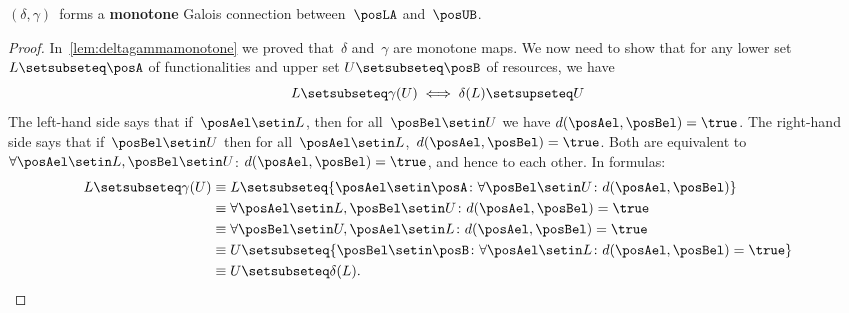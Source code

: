 \begin{lemma}
    $(\delta, \gamma)$~forms a \textbf{monotone}
    Galois connection between~$\posLA$ and~$\posUB$.
\end{lemma}
\begin{proof}
    In~\cref{lem:deltagammamonotone} we proved that~$\delta$ and~$\gamma$ are monotone maps.
    We now need to show that for any lower set~$L\setsubseteq \posA$ of functionalities and upper set $U\setsubseteq \posB$ of resources, we have
    \begin{equation}
        L\setsubseteq\gamma(U) \iff \delta(L)\setsupseteq U
    \end{equation}
    The left-hand side says that if~$\posAel\setin L$, then for all~$\posBel \setin U$ we have $d(\posAel,\posBel)=\true$.
    The right-hand side says that if~$\posBel\setin U$ then for all~$\posAel \setin L$,~$d(\posAel,\posBel)=\true$.
    Both are equivalent to~$\forall \posAel\setin L,\posBel\setin U$: $d(\posAel,\posBel)=\true$, and hence to each other.
    In formulas:
    \begin{equation}
        \begin{aligned}
            L \setsubseteq \gamma(U) & \equiv L\setsubseteq \{\posAel \setin \posA\colon \forall \posBel\setin U\colon d(\posAel,\posBel)\} \\
                                  & \equiv \forall \posAel\setin L, \posBel\setin U \colon d(\posAel,\posBel)=\true \\
                                  & \equiv \forall \posBel\setin U, \posAel\setin L \colon d(\posAel,\posBel)=\true \\
                                  & \equiv U\setsubseteq \{\posBel\setin \posB\colon \forall \posAel\setin L\colon d(\posAel,\posBel)=\true \} \\
                                  & \equiv U\setsubseteq \delta(L).
        \end{aligned}
    \end{equation}
\end{proof}

